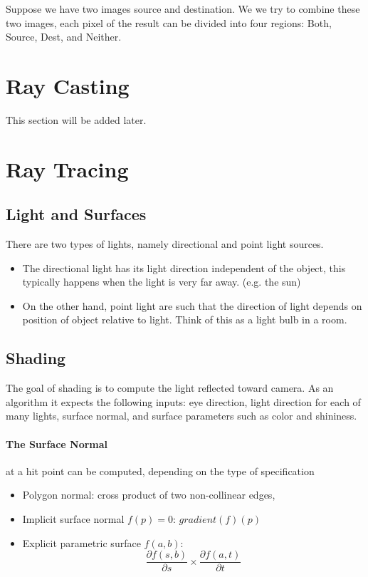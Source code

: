 \documentclass[11pt]{article}
\begin{document}
Suppose we have two images source and destination. We we try to combine these two images, each pixel of the result can be divided into four regions: Both, Source, Dest, and Neither. 















\section{Ray Casting} This section will be added later. 
\section{Ray Tracing}
\subsection{Light and Surfaces}
There are two types of lights, namely directional and point light sources. 
\begin{itemize}
	\item The directional light has its light direction independent of the object, this typically happens when the light is very far away. (e.g. the sun)
	\item On the other hand, point light are such that the direction of light depends on position of object relative to light. Think of this as a light bulb in a room. 
\end{itemize}
\subsection{Shading}
The goal of shading is to compute the light reflected toward camera. As an algorithm it expects the following inputs: eye direction, light direction for each of many lights, surface normal, and surface parameters such as color and shininess. 

\paragraph{The Surface Normal} at a hit point can be computed, depending on the type of specification
\begin{itemize}
	\item Polygon normal: cross product of two non-collinear edges, 
	\item Implicit surface normal $f(p) = 0$: $gradient(f)(p)$
	\item Explicit parametric surface $f(a,b)$: 
	\begin{equation}
		\frac{\partial f(s, b)}{\partial s} \times \frac{\partial f(a, t)}{\partial t}
	\end{equation}
\end{itemize}
\end{document}
